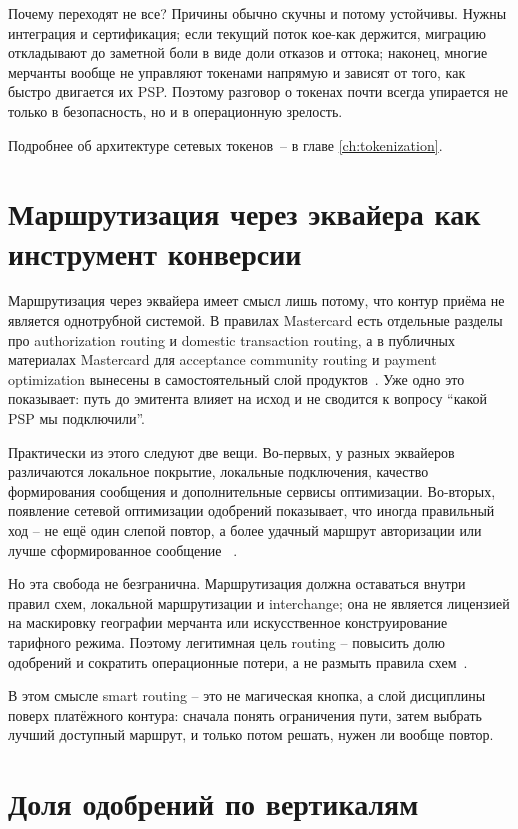 Почему переходят не все? Причины обычно скучны и потому устойчивы.
Нужны интеграция и сертификация; если текущий поток кое-как держится,
миграцию откладывают до заметной боли в виде доли отказов и оттока;
наконец, многие мерчанты вообще не управляют токенами напрямую и
зависят от того, как быстро двигается их PSP. Поэтому разговор о
токенах почти всегда упирается не только в безопасность, но и в
операционную зрелость.

Подробнее об архитектуре сетевых токенов~-- в главе \ref{ch:tokenization}.

\section{Маршрутизация через эквайера как инструмент конверсии}
\label{sec:decline-routing}

Маршрутизация через эквайера имеет смысл лишь потому, что контур
приёма не является однотрубной системой. В правилах Mastercard есть
отдельные разделы про authorization routing и domestic transaction
routing, а в публичных материалах Mastercard для acceptance community
routing и payment optimization вынесены в самостоятельный слой
продуктов~\cite{mc-tpr}\cite{mc-acquirers-psps}\cite{mc-pop}.
Уже одно это показывает: путь до эмитента влияет на исход и не
сводится к вопросу \enquote{какой PSP мы подключили}.

Практически из этого следуют две вещи. Во-первых, у разных эквайеров
различаются локальное покрытие, локальные подключения, качество
формирования сообщения и дополнительные сервисы оптимизации.
Во-вторых, появление сетевой оптимизации одобрений показывает,
что иногда правильный ход -- не ещё один слепой повтор, а более
удачный маршрут авторизации или лучше сформированное сообщение
~\cite{mc-pop}.

Но эта свобода не безгранична. Маршрутизация должна оставаться внутри
правил схем, локальной маршрутизации и interchange; она не является
лицензией на маскировку географии мерчанта или искусственное
конструирование тарифного режима. Поэтому легитимная цель routing --
повысить долю одобрений и сократить операционные потери, а не размыть
правила схем~\cite{visa-core-rules}\cite{mc-rules}\cite{mc-tpr}.

В этом смысле smart routing -- это не магическая кнопка, а слой
дисциплины поверх платёжного контура: сначала понять ограничения пути,
затем выбрать лучший доступный маршрут, и только потом решать, нужен ли
вообще повтор.

\section{Доля одобрений по вертикалям}
\label{sec:decline-benchmarks}

